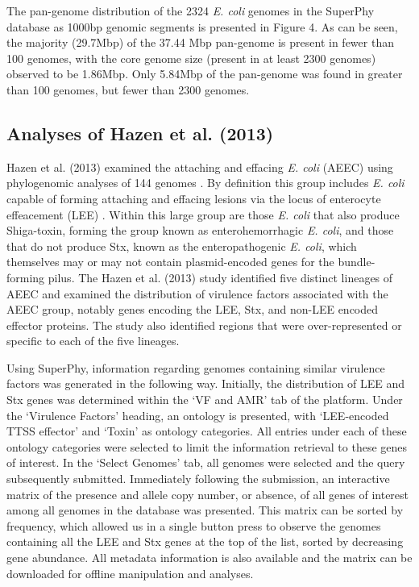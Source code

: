\documentclass[doublespacing, linenumbers]{bmcart}
\begin{document}
The pan-genome distribution of the 2324 \textit{E. coli} genomes in the SuperPhy database as 1000bp genomic segments is presented in Figure 4. As can be seen, the majority (29.7Mbp) of the 37.44 Mbp pan-genome is present in fewer than 100 genomes, with the core genome size (present in at least 2300 genomes) observed to be 1.86Mbp. Only 5.84Mbp of the pan-genome was found in greater than 100 genomes, but fewer than 2300 genomes.

\subsection{Analyses of Hazen et al. (2013)}
Hazen et al. (2013) examined the attaching and effacing \textit{E. coli} (AEEC) using phylogenomic analyses of 144 genomes \cite{hazen_refining_2013}. By definition this group includes \textit{E. coli} capable of forming attaching and effacing lesions via the locus of enterocyte effeacement (LEE) \cite{croxen_recent_2013}. Within this large group are those \textit{E. coli} that also produce Shiga-toxin, forming the group known as enterohemorrhagic \textit{E. coli}, and those that do not produce Stx, known as  the enteropathogenic \textit{E. coli}, which themselves may or may not contain plasmid-encoded genes for the bundle-forming pilus.  The Hazen et al. (2013) study identified five distinct lineages of AEEC and examined the distribution of virulence factors associated with the AEEC group, notably genes encoding the LEE, Stx, and non-LEE encoded effector proteins. The study also identified regions that were over-represented or specific to each of the five lineages.

Using SuperPhy, information regarding genomes containing similar virulence factors was generated in the following way. Initially, the distribution of LEE and Stx genes was determined within the `VF and AMR' tab of the platform. Under the `Virulence Factors' heading, an ontology is presented, with `LEE-encoded TTSS effector' and `Toxin' as ontology categories. All entries under each of these ontology categories were selected to limit the information retrieval to these genes of interest. In the `Select Genomes' tab, all genomes were selected and the query subsequently submitted. Immediately following the submission, an interactive matrix of the presence and allele copy number, or absence, of all genes of interest among all genomes in the database was presented. This matrix can be sorted by frequency, which allowed us in a single button press to observe the genomes containing all the LEE and Stx genes at the top of the list, sorted by decreasing gene abundance. All metadata information is also available and the matrix can be downloaded for offline manipulation and analyses.
\end{document}
